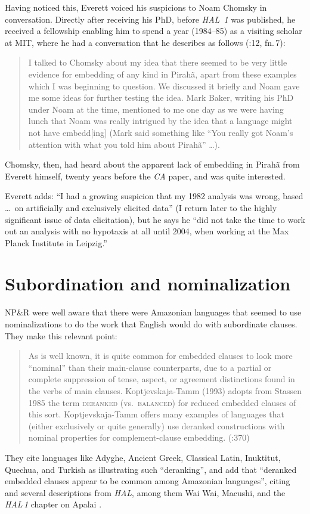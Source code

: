 \documentclass[output=paper,colorlinks,citecolor=brown
]{langscibook}
\begin{document}
Having noticed this, Everett voiced his suspicions to Noam Chomsky in
conversation. Directly after receiving his PhD, before \textit{HAL~1}
was published, he received a fellowship enabling him to spend a year
(1984--85) as a visiting scholar at MIT, where he had a conversation
that he describes as follows (\citealt{Everett07}:12, fn.\,7):
\begin{quote}
I talked to Chomsky about my idea that there seemed to be very
little evidence for embedding of any kind in Pirahã, apart from
these \mbox{} examples which I was beginning to question.
We discussed it briefly and Noam gave me some ideas for further
testing the idea. Mark Baker, writing his PhD under Noam at
the time, mentioned to me one day as we were having lunch that Noam
was really intrigued by the idea that a language might not have
embedd[ing] (Mark said something like ``You really got Noam's
attention with what you told him about Pirah{\~a}'' \ldots).
\end{quote}
Chomsky, then, had heard about the apparent lack of embedding in
Pirah{\~a} from Everett himself, twenty years before the \textit{CA}
paper, and was quite interested.

Everett adds: ``I had a growing suspicion that my 1982 analysis was
wrong, based \ldots\ on artificially and exclusively elicited data''
(I return later to the highly significant issue of data elicitation),
but he says he ``did not take the time to work out an analysis with
no hypotaxis at all until 2004, when working at the Max Planck
Institute in Leipzig.''

\section{Subordination and nominalization}

NP\&R were well aware that there were Amazonian languages that seemed
to use nominalizations to do the work that English would do with
subordinate clauses. They make this relevant point:
\begin{quote}
As is well known, it is quite common for embedded clauses to look
more ``nominal'' than their main-clause counterparts, due to a partial
or complete suppression of tense, aspect, or agreement distinctions
found in the verbs of main clauses. Koptjevskaja-Tamm (1993) adopts
from Stassen 1985 the term \textsc{deranked} (vs.\ \textsc{balanced})
for reduced embedded clauses of this sort. Koptjevskaja-Tamm offers
many examples of languages that (either exclusively or quite generally)
use deranked constructions with nominal properties for complement-clause
embedding.
(\citealt{NevPesRod09a}:370)
\end{quote}
They cite languages like Adyghe, Ancient Greek, Classical Latin, Inuktitut,
Quechua, and Turkish as illustrating such ``deranking'', and add that
``deranked embedded clauses appear to be common among Amazonian languages'',
citing \citet{Derbyshire87} and several descriptions from \textit{HAL},
among them Wai Wai, Macushi, and the \textit{HAL\,1} chapter on Apalai
\citep{Koehn86}.
\end{document}
